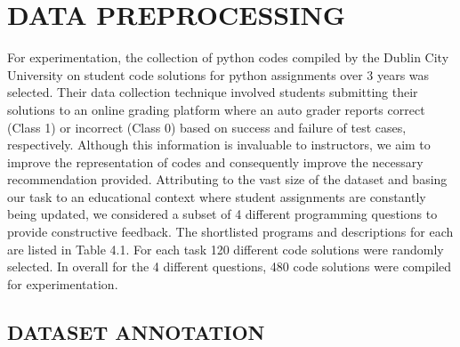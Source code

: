 
\chapter{DATA PREPROCESSING} %

For experimentation, the collection of python codes compiled by the Dublin City University\cite{A} on student code solutions for python assignments over 3 years was selected. Their data collection technique involved students submitting their solutions to an online grading platform where an auto grader reports correct (Class 1) or incorrect (Class 0) based on success and failure of test cases, respectively. Although this information is invaluable to instructors, we aim to improve the representation of codes and consequently improve the necessary recommendation provided. Attributing to the vast size of the dataset and basing our task to an educational context where student assignments are constantly being updated, we considered a subset of 4 different programming questions to provide constructive feedback. The shortlisted programs and descriptions for each are listed in Table 4.1. For each task 120 different code solutions were randomly selected. In overall for the 4 different questions, 480 code solutions were compiled for experimentation. 

\begin{table}[H]
\caption{Questions and Description}
\centering
{}

\label{tab:ques}
\end{table}

\section{DATASET ANNOTATION}

